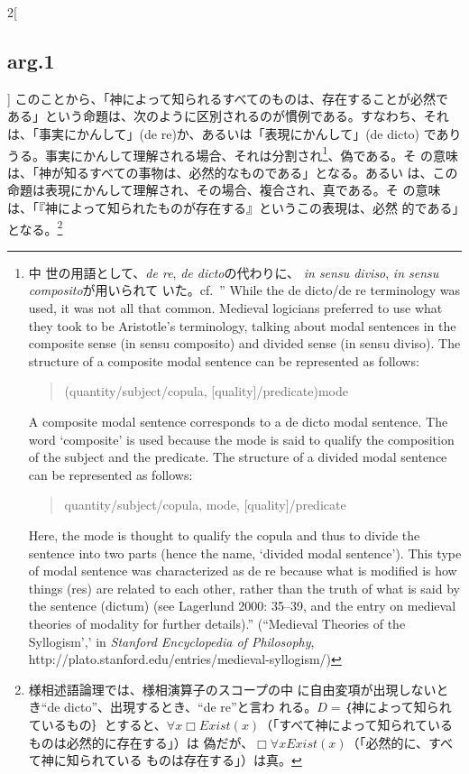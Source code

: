 \documentclass[paper=a4paper,fontsize=10pt,jafontsize=9pt,titlepage]{jlreq}
\begin{document}
\begin{paracol}{2}[\subsection{arg.1}]
このことから、「神によって知られるすべてのものは、存在することが必然で
ある」という命題は、次のように区別されるのが慣例である。すなわち、それ
は、「事実にかんして」(de re)か、あるいは「表現にかんして」(de dicto)
でありうる。事実にかんして理解される場合、それは分割され\footnote {中
世の用語として、{\itshape de re}, {\itshape de dicto}の代わりに、
{\itshape in sensu diviso}, {\itshape in sensu composito}が用いられて
いた。cf.~'' While the de dicto/de re terminology was used, it was not
all that common. Medieval logicians preferred to use what they took to
be Aristotle's terminology, talking about modal sentences in the
composite sense (in sensu composito) and divided sense (in sensu
diviso). The structure of a composite modal sentence can be
represented as follows:
\begin{quote}
   (quantity/subject/copula, [quality]/predicate)mode
\end{quote}
A composite modal sentence corresponds to a de dicto modal
sentence. The word ‘composite’ is used because the mode is said to
qualify the composition of the subject and the predicate. The
structure of a divided modal sentence can be represented as follows:
\begin{quote}
quantity/subject/copula, mode, [quality]/predicate
\end{quote}
Here, the mode is thought to qualify the copula and thus to divide the
sentence into two parts (hence the name, ‘divided modal
sentence’). This type of modal sentence was characterized as de re
because what is modified is how things (res) are related to each
other, rather than the truth of what is said by the sentence (dictum)
(see Lagerlund 2000: 35–39, and the entry on medieval theories of
modality for further details).'' (``Medieval Theories of the
Syllogism',' in {\itshape Stanford Encyclopedia of Philosophy},
http://plato.stanford.edu/entries/medieval-syllogism/) }、偽である。そ
の意味は、「神が知るすべての事物は、必然的なものである」となる。あるい
は、この命題は表現にかんして理解され、その場合、複合され、真である。そ
の意味は、「『神によって知られたものが存在する』というこの表現は、必然
的である」となる。\footnote{様相述語論理では、様相演算子のスコープの中
に自由変項が出現しないとき``de dicto''、出現するとき、``de re''と言わ
れる。$D = $｛神によって知られているもの｝とすると、$\forall x \Box
Exist(x)$（「すべて神によって知られているものは必然的に存在する」）は
偽だが、$\Box \forall x Exist(x)$（「必然的に、すべて神に知られている
ものは存在する」）は真。}

\switchcolumn*


\end{paracol}
\end{document}
